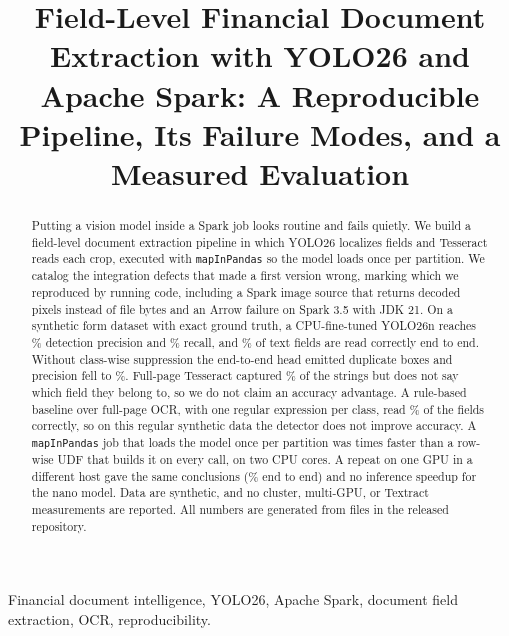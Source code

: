 \documentclass[conference]{IEEEtran}
\begin{document}
\title{Field-Level Financial Document Extraction with YOLO26 and Apache Spark: A Reproducible Pipeline, Its Failure Modes, and a Measured Evaluation}
\author{}
\maketitle
\begin{abstract}
Putting a vision model inside a Spark job looks routine and fails quietly. We build a field-level document extraction pipeline in which YOLO26 localizes fields and Tesseract reads each crop, executed with \texttt{mapInPandas} so the model loads once per partition. We catalog the integration defects that made a first version wrong, marking which we reproduced by running code, including a Spark image source that returns decoded pixels instead of file bytes and an Arrow failure on Spark 3.5 with JDK 21. On a synthetic form dataset with exact ground truth, a CPU-fine-tuned YOLO26n reaches \valNmsPrec\% detection precision and \valNmsRec\% recall, and \valNmsEndToEnd\% of text fields are read correctly end to end. Without class-wise suppression the end-to-end head emitted \valDefDup{} duplicate boxes and precision fell to \valDefPrec\%. Full-page Tesseract captured \valBaseCapture\% of the strings but does not say which field they belong to, so we do not claim an accuracy advantage. A rule-based baseline over full-page OCR, with one regular expression per class, read \valRuleAcc\% of the fields correctly, so on this regular synthetic data the detector does not improve accuracy. A \texttt{mapInPandas} job that loads the model once per partition was \valPatPartSixteenSpeedup{} times faster than a row-wise UDF that builds it on every call, on two CPU cores. A repeat on one GPU in a different host gave the same conclusions (\valGpuNmsEndToEnd\% end to end) and no inference speedup for the nano model. Data are synthetic, and no cluster, multi-GPU, or Textract measurements are reported. All numbers are generated from files in the released repository.
\end{abstract}
\begin{IEEEkeywords}
Financial document intelligence, YOLO26, Apache Spark, document field extraction, OCR, reproducibility.
\end{IEEEkeywords}




\end{document}
